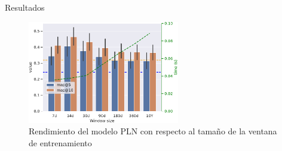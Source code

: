 \begin{frame}{Resultados}
    \begin{figure}
        \centering
        \includegraphics[height=45mm]{./images/graphs/11_cosine_results_window-size_W-THU_normalize=True.pdf}
        \caption{Rendimiento del modelo PLN con respecto al tamaño de la ventana de entrenamiento}
    \end{figure}
\end{frame}

